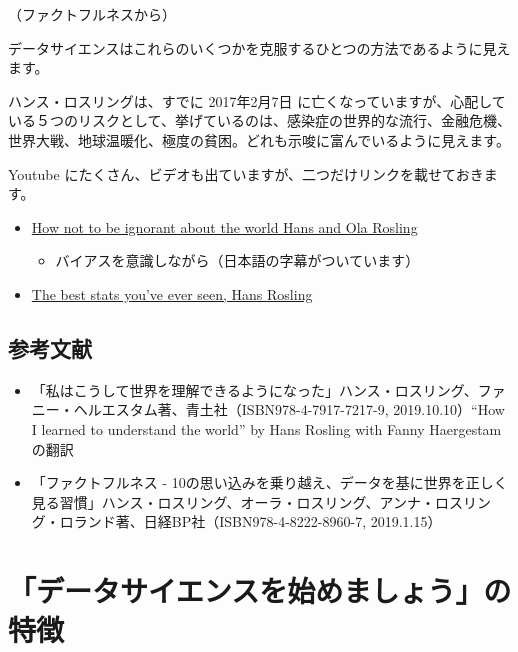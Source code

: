 \documentclass[
  xelatex, ja=standard]{bxjsbook}
\providecommand{\tightlist}{%
  \setlength{\itemsep}{0pt}\setlength{\parskip}{0pt}}
\theoremstyle{definition}
\theoremstyle{definition}
\theoremstyle{definition}
\theoremstyle{definition}
\theoremstyle{remark}
\begin{document}
（ファクトフルネスから）

データサイエンスはこれらのいくつかを克服するひとつの方法であるように見えます。

ハンス・ロスリングは、すでに 2017年2月7日 に亡くなっていますが、心配している５つのリスクとして、挙げているのは、感染症の世界的な流行、金融危機、世界大戦、地球温暖化、極度の貧困。どれも示唆に富んでいるように見えます。

Youtube にたくさん、ビデオも出ていますが、二つだけリンクを載せておきます。

\begin{itemize}
\tightlist
\item
  \href{https://www.youtube.com/watch?v=Sm5xF-UYgdg}{How not to be ignorant about the world \textbar{} Hans and Ola Rosling}

  \begin{itemize}
  \tightlist
  \item
    バイアスを意識しながら（日本語の字幕がついています）
  \end{itemize}
\item
  \href{http://www.edtech.events/the-best-stats-youve-ever-seen-hans-rosling/}{The best stats you've ever seen, Hans Rosling}
\end{itemize}

\hypertarget{ux53c2ux8003ux6587ux732e}{%
\subsection{参考文献}\label{ux53c2ux8003ux6587ux732e}}

\begin{itemize}
\tightlist
\item
  「私はこうして世界を理解できるようになった」ハンス・ロスリング、ファニー・ヘルエスタム著、青土社（ISBN978-4-7917-7217-9, 2019.10.10）``How I learned to understand the world'' by Hans Rosling with Fanny Haergestam の翻訳
\item
  「ファクトフルネス - 10の思い込みを乗り越え、データを基に世界を正しく見る習慣」ハンス・ロスリング、オーラ・ロスリング、アンナ・ロスリング・ロランド著、日経BP社（ISBN978-4-8222-8960-7, 2019.1.15）
\end{itemize}

\hypertarget{ux30c7ux30fcux30bfux30b5ux30a4ux30a8ux30f3ux30b9ux3092ux59cbux3081ux307eux3057ux3087ux3046ux306eux7279ux5fb4}{%
\section{「データサイエンスを始めましょう」の特徴}\label{ux30c7ux30fcux30bfux30b5ux30a4ux30a8ux30f3ux30b9ux3092ux59cbux3081ux307eux3057ux3087ux3046ux306eux7279ux5fb4}}
\end{document}

